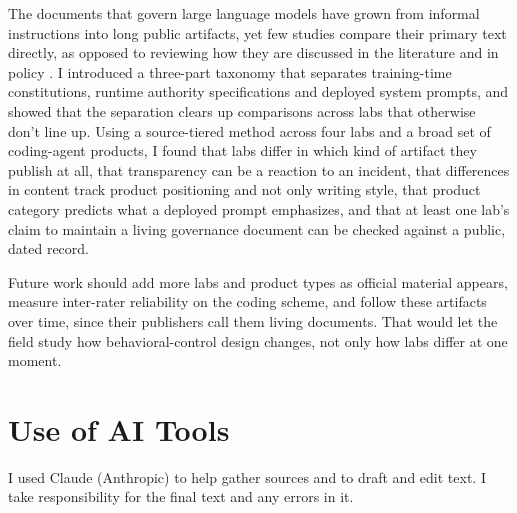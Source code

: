 \documentclass[11pt]{article}
\begin{document}
The documents that govern large language models have grown from informal
instructions into long public artifacts, yet few studies compare their primary
text directly, as opposed to reviewing how they are discussed in the
literature and in policy \citep{neumann2026governance}. I introduced a
three-part taxonomy that separates training-time constitutions, runtime
authority specifications and deployed system prompts, and showed that the
separation clears up comparisons across labs that otherwise don't line up.
Using a source-tiered method across four labs and a broad set of coding-agent
products, I found that labs differ in which kind of artifact they publish at
all, that transparency can be a reaction to an incident, that differences in
content track product positioning and not only writing style, that product
category predicts what a deployed prompt emphasizes, and that at least one
lab's claim to maintain a living governance document can be checked against a
public, dated record.

Future work should add more labs and product types as official material
appears, measure inter-rater reliability on the coding scheme, and follow
these artifacts over time, since their publishers call them living documents.
That would let the field study how behavioral-control design changes, not only
how labs differ at one moment.

\section*{Use of AI Tools}
I used Claude (Anthropic) to help gather sources and to draft and edit text.
I take responsibility for the final text and any errors in it.
\end{document}
